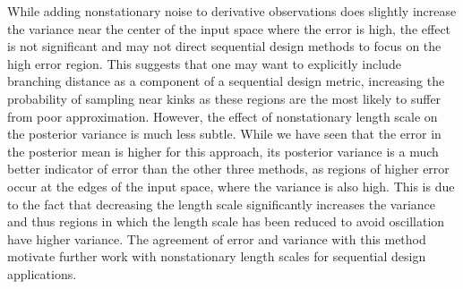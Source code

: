 \documentclass{article}
\numberwithin{equation}{section}
\begin{document}
While adding nonstationary noise to derivative observations does slightly increase the variance near the center of the input space where the error is high, the effect is not significant and may not direct sequential design methods to focus on the high error region. This suggests that one may want to explicitly include branching distance as a component of a sequential design metric, increasing the probability of sampling near kinks as these regions are the most likely to suffer from poor approximation. However, the effect of nonstationary length scale on the posterior variance is much less subtle. While we have seen that the error in the posterior mean is higher for this approach, its posterior variance is a much better indicator of error than the other three methods, as regions of higher error occur at the edges of the input space, where the variance is also high. This is due to the fact that decreasing the length scale significantly increases the variance and thus regions in which the length scale has been reduced to avoid oscillation have higher variance. The agreement of error and variance with this method motivate further work with nonstationary length scales for sequential design applications.
\end{document}
